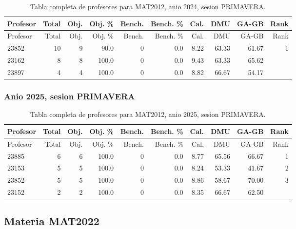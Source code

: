 \begingroup
\scriptsize
\setlength{\tabcolsep}{3pt}
\begin{longtable}{lrrrrrrrrr}
\caption{Tabla completa de profesores para MAT2012, anio 2024, sesion PRIMAVERA.}\label{tab:prof-period-mat2012-2024-primavera}\\
\toprule
Profesor & Total & Obj. & Obj. \% & Bench. & Bench. \% & Cal. & DMU & GA-GB & Rank \\
\midrule
\endfirsthead
\toprule
Profesor & Total & Obj. & Obj. \% & Bench. & Bench. \% & Cal. & DMU & GA-GB & Rank \\
\midrule
\endhead
23852 & 10 & 9 & 90.0 & 0 & 0.0 & 8.22 & 63.33 & 61.67 & 1 \\
23162 & 8 & 8 & 100.0 & 0 & 0.0 & 9.43 & 63.33 & 65.62 &  \\
23897 & 4 & 4 & 100.0 & 0 & 0.0 & 8.82 & 66.67 & 54.17 &  \\
\bottomrule
\end{longtable}
\endgroup

\subsubsection{Anio 2025, sesion PRIMAVERA}

\begingroup
\scriptsize
\setlength{\tabcolsep}{3pt}
\begin{longtable}{lrrrrrrrrr}
\caption{Tabla completa de profesores para MAT2012, anio 2025, sesion PRIMAVERA.}\label{tab:prof-period-mat2012-2025-primavera}\\
\toprule
Profesor & Total & Obj. & Obj. \% & Bench. & Bench. \% & Cal. & DMU & GA-GB & Rank \\
\midrule
\endfirsthead
\toprule
Profesor & Total & Obj. & Obj. \% & Bench. & Bench. \% & Cal. & DMU & GA-GB & Rank \\
\midrule
\endhead
23885 & 6 & 6 & 100.0 & 0 & 0.0 & 8.77 & 65.56 & 66.67 & 1 \\
23153 & 5 & 5 & 100.0 & 0 & 0.0 & 8.24 & 53.33 & 41.67 & 2 \\
23852 & 5 & 5 & 100.0 & 0 & 0.0 & 8.86 & 58.67 & 70.00 & 3 \\
23152 & 2 & 2 & 100.0 & 0 & 0.0 & 8.35 & 66.67 & 62.50 &  \\
\bottomrule
\end{longtable}
\endgroup

\subsection{Materia MAT2022}

